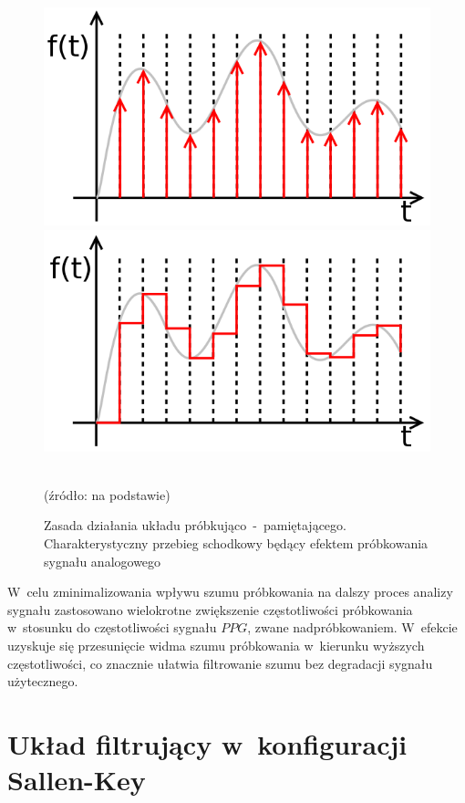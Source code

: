 \begin{figure}[ht]
	\includegraphics[scale = 0.35]{graphic/sample}
	\includegraphics[scale = 0.35]{graphic/sample_hold}
	\caption{Zasada działania układu próbkująco~-~pamiętającego. Charakterystyczny przebieg schodkowy będący efektem próbkowania sygnału analogowego}
	~\\
	(źródło: na podstawie\cite{4066})
	\label{rys:samples}
\end{figure}

W~celu zminimalizowania wpływu szumu próbkowania na dalszy proces analizy sygnału zastosowano wielokrotne zwiększenie częstotliwości próbkowania w~stosunku do częstotliwości sygnału $PPG$, zwane nadpróbkowaniem. 
W~efekcie uzyskuje się przesunięcie widma szumu próbkowania w~kierunku wyższych częstotliwości, co znacznie ułatwia filtrowanie szumu bez degradacji sygnału użytecznego.

\section{Układ filtrujący w~konfiguracji Sallen-Key}
\label{sec:SallenKey}

